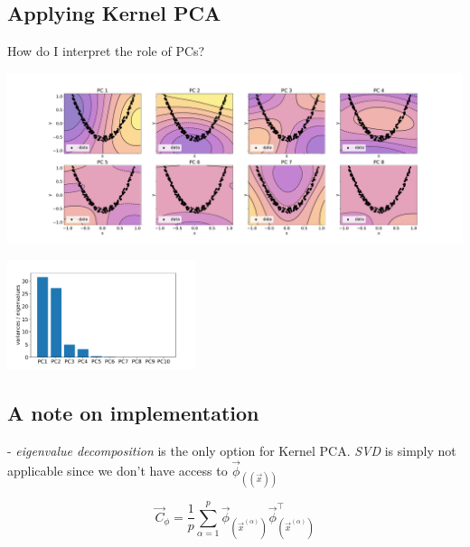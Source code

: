 

\subsection{Applying Kernel PCA}

\begin{frame}{How do I interpret the role of PCs?}


\svspace{-7mm}

\begin{center}
	\includegraphics[height=5cm]{img/contourplot_kpca_rbf}
\end{center}
\svspace{-0.8cm}
\begin{center}
	\includegraphics[height=3.2cm]{img/screeplot_kpca_rbf.pdf}
\end{center}

\end{frame}

\subsection{A note on implementation}

\begin{frame}{\subsecname}



\pause

- \emph{eigenvalue decomposition} is the only option for Kernel PCA. \emph{SVD} is simply not applicable since we don't have access to $\vec \phi_{((\vec x))}$

\begin{equation}
\vec C_{\phi} = \frac{1}{p} \sum_{\alpha=1}^{p} \vec{\phi}_{(\vec{x}^{(\alpha)})} \vec{\phi}^{\top}_{(\vec{x}^{(\alpha)})}
\end{equation}

\end{frame}

